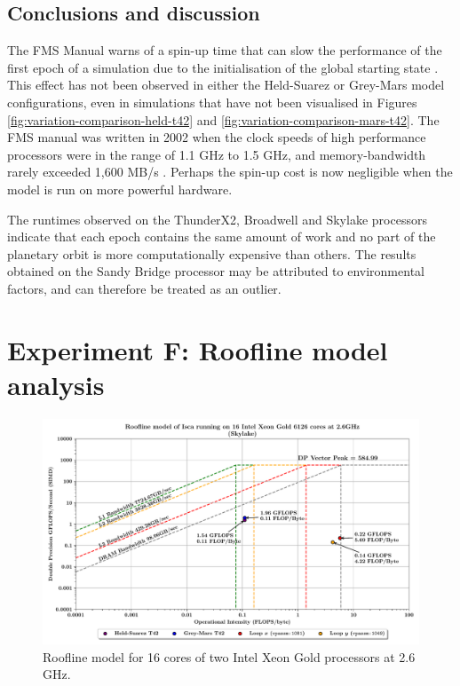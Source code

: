 \documentclass[a4paper,11pt]{report}
\begin{document}
\subsection{Conclusions and discussion}
The FMS Manual warns of a spin-up time that can slow the performance of the first epoch of a simulation due to the initialisation of the global starting state \cite{balaji2002fms}. This effect has not been observed in either the Held-Suarez or Grey-Mars model configurations, even in simulations that have not been visualised in Figures \ref{fig:variation-comparison-held-t42} and \ref{fig:variation-comparison-mars-t42}. The FMS manual was written in 2002 when the clock speeds of high performance processors were in the range of 1.1 GHz to 1.5 GHz, and memory-bandwidth rarely exceeded 1,600 MB/s \cite{behling2001power4, carvalho2002gap}. Perhaps the spin-up cost is now negligible when the model is run on more powerful hardware. 
\par
The runtimes observed on the ThunderX2, Broadwell and Skylake processors indicate that each epoch contains the same amount of work and no part of the planetary orbit is more computationally expensive than others. The results obtained on the Sandy Bridge processor may be attributed to environmental factors, and can therefore be treated as an outlier. 


\section{Experiment F: Roofline model analysis}

\begin{figure}[htbp]
\begin{center}
 \includegraphics[width=\textwidth]{img/roofline_model_bluepebble.pdf}
\caption[Roofline model of Isca on Intel hardware]{Roofline model for 16 cores of two Intel Xeon Gold processors at 2.6 GHz. } 
\label{fig:roofline}
\end{center}
\end{figure}
\end{document}

